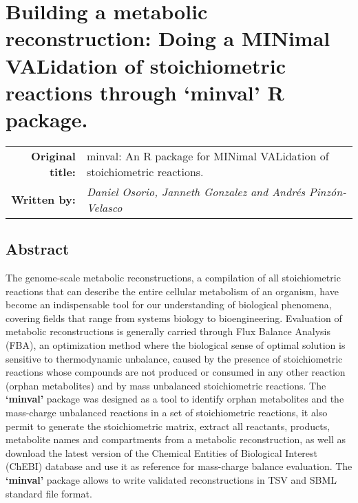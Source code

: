 \chapter{Building a metabolic reconstruction: Doing a MINimal VALidation of stoichiometric reactions through `minval' R package.}
\begin{tabular}{rm{12.5cm}}
\textsf{\textbf{Original title:}}& minval: An R package for MINimal VALidation of stoichiometric \newline reactions.\\
\textsf{\textbf{Written by:}} & \textit{Daniel Osorio, Janneth Gonzalez and Andrés Pinzón-Velasco}\\ 
\end{tabular}
\section*{Abstract}
The genome-scale metabolic reconstructions, a compilation of all stoichiometric reactions that can describe the entire cellular metabolism of an organism, have become an indispensable tool for our understanding of biological phenomena, covering fields that range from systems biology to bioengineering. Evaluation of metabolic reconstructions is generally carried through Flux Balance Analysis (FBA), an optimization method where the biological sense of optimal solution is sensitive to thermodynamic unbalance, caused by the presence of stoichiometric reactions whose compounds are not produced or consumed in any other reaction (orphan metabolites) and by mass unbalanced stoichiometric reactions. The \textbf{`minval'} package was designed as a tool to identify orphan metabolites and the mass-charge unbalanced reactions in a set of stoichiometric reactions, it also permit to generate the stoichiometric matrix, extract all reactants, products, metabolite names and compartments from a metabolic reconstruction, as well as download the latest version of the Chemical Entities of Biological Interest (ChEBI) database and use it as reference for mass-charge balance evaluation. The \textbf{`minval'} package allows to write validated reconstructions in TSV and SBML standard file format.
